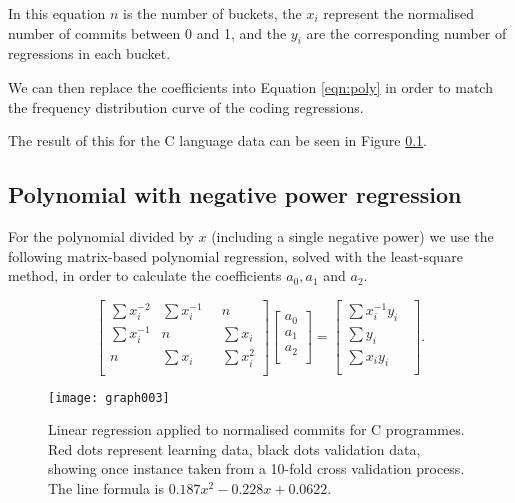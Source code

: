 \documentclass[10pt,journal,compsoc]{IEEEtran}
\begin{document}
In this equation $n$ is the number of buckets, the $x_i$ represent the normalised number of commits between 0 and 1, and the $y_i$ are the corresponding number of regressions in each bucket.

We can then replace the coefficients into Equation \ref{eqn:poly} in order to match the frequency distribution curve of the coding regressions.

The result of this for the C language data can be seen in Figure \ref{}.

\subsection{Polynomial with negative power regression}

For the polynomial divided by $x$ (\ie including a single negative power) we use the following matrix-based polynomial regression, solved with the least-square method, in order to calculate the coefficients $a_0, a_1$ and $a_2$.

\begin{equation}
\begin{bmatrix}
\sum x_i^{-2} & \sum x_i^{-1}        & n            \\
\sum x_i^{-1} & n                    & \sum x_i     \\
n             & \sum x_i \phantom{-} & \sum x_i^{2} \\
\end{bmatrix}
\begin{bmatrix}
a_0 \\
a_1 \\
a_2 \\
\end{bmatrix}
=
\begin{bmatrix}
\sum x_i^{-1} y_i        \\
\sum y_i \phantom{x_i -} \\
\sum x_i y_i \phantom{-} \\
\end{bmatrix}.
\end{equation}

\begin{figure}[t]
\centering
\texttt{[image: graph003]}%
\caption{\label{fig:c-linear}Linear regression applied to normalised commits for C programmes. Red dots represent learning data, black dots validation data, showing once instance taken from a 10-fold cross validation process. The line formula is $0.187x^{2} - 0.228x + 0.0622$.}
\end{figure}
\end{document}
